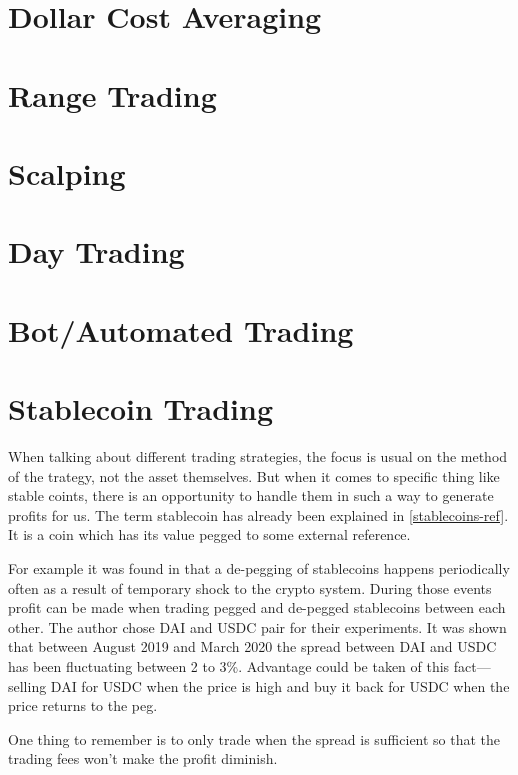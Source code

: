 \section{Dollar Cost Averaging}

\section{Range Trading}

\section{Scalping}

\section{Day Trading}

\section{Bot/Automated Trading}

\section{Stablecoin Trading}

When talking about different trading strategies, the focus is usual on the method of the trategy, not the asset themselves. But when it comes to specific thing like stable coints, there is an opportunity to handle them in such a way to generate profits for us.
The term stablecoin has already been explained in \ref{stablecoins-ref}. It is a coin which has its value pegged to some external reference.

For example it was found in \cite{make-money-stablecoins} that a de-pegging of stablecoins happens periodically often as a result of temporary shock to the crypto system. During those events profit can be made when trading pegged and de-pegged stablecoins between each other. The author chose DAI and USDC pair for their experiments. It was shown that between August 2019 and March 2020 the spread between DAI and USDC has been fluctuating between 2 to 3\%. Advantage could be taken of this fact---selling DAI for USDC when the price is high and buy it back for USDC when the price returns to the peg.

One thing to remember is to only trade when the spread is sufficient so that the trading fees won't make the profit diminish.

